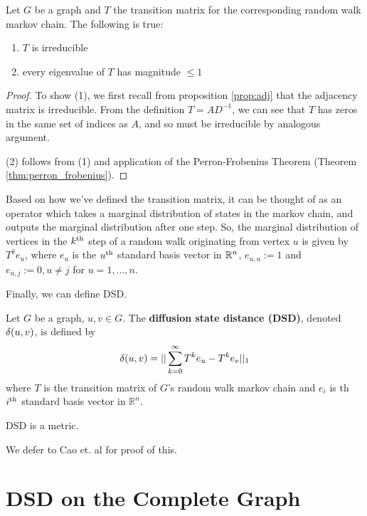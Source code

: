 \begin{proposition}[Properties of $T$]
  Let $G$ be a graph and $T$ the transition matrix for the corresponding random walk markov chain.
  The following is true:
  \begin{enumerate}
  \item $T$ is irreducible
  \item every eigenvalue of $T$ has magnitude $\leq 1$
  \end{enumerate}
\end{proposition}

\begin{proof}
  To show (1), we first recall from proposition \ref{prop:adj} that the adjacency matrix is
  irreducible. From the definition $T = AD^{-1}$, we can see that $T$ has zeros in the same set of
  indices as $A$, and so must be irreducible by analogous argument.

  (2) follows from (1) and application of the Perron-Frobenius Theorem (Theorem
  \ref{thm:perron_frobenius}).
\end{proof}

Based on how we've defined the transition matrix, it can be thought of as an operator which takes a
marginal distribution of states in the markov chain, and outputs the marginal distribution after one
step. So, the marginal distribution of vertices in the $k^{\mathrm{th}}$ step of a random walk originating
from vertex $u$ is given by $T^ke_u$, where $e_u$ is the $u^{\mathrm{th}}$ standard basis vector in $\mathbb{R}^n$,
$e_{u,u} := 1$ and $e_{u,j} := 0, u \neq j$ for $u=1,...,n$.

Finally, we can define DSD.

\begin{definition}
  Let $G$ be a graph, $u,v \in G$. The \textbf{diffusion state distance (DSD)}, denoted $\delta(u,v)$,
  is defined by
  \[
    \delta(u,v) = ||\sum_{k =0}^{\infty}{T^ke_u - T^ke_v}||_1
  \]
  where $T$ is the transition matrix of $G$'s random walk markov chain and $e_i$ is th $i^{\mathrm{th}}$
  standard basis vector in $\mathbb{R}^n$.
\end{definition}

\begin{theorem}
  DSD is a metric.
\end{theorem}

We defer to Cao et. al for proof of this.

\section{DSD on the Complete Graph}

